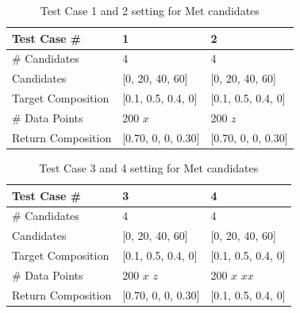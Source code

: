 \begin{table} 
\begin{center}
\begin{tabular}{| l | l | l |  }
\hline
Test Case \# & 1 & 2 \\
\hline
\# Candidates & 4 & 4 \\
\hline
Candidates & [0, 20, 40, 60] & [0, 20, 40, 60] \\
\hline
Target Composition & [0.1, 0.5, 0.4, 0] & [0.1, 0.5, 0.4, 0] \\
\hline
\# Data Points & 200 $x$ & 200 $z$ \\
\hline
Return Composition & [0.70, 0, 0, 0.30] & [0.70, 0, 0, 0.30] \\
\hline
\end{tabular} 
\end{center}
\caption{Test Case 1 and 2 setting for Met candidates} 
\label{tab:4.1}
\end{table}	

\begin{table} 
\begin{center}
\begin{tabular}{| l | p{3cm}| p{3cm} | }
\hline
Test Case \# & 3 & 4 \\
\hline
\# Candidates & 4 & 4  \\
\hline
Candidates & [0, 20, 40, 60] & [0, 20, 40, 60]\\
\hline
Target Composition & [0.1, 0.5, 0.4, 0] & [0.1, 0.5, 0.4, 0]\\
\hline
\# Data Points & 200 $x$ \newline 200 $z$ & 200 $x$ \newline 200 $xx$\\
\hline
Return Composition & [0.70, 0, 0, 0.30] & [0.1, 0.5, 0.4, 0]\\
\hline
\end{tabular} 
\end{center}
\caption{Test Case 3 and 4 setting for Met candidates} 
\label{tab:case3and4}
\end{table}	

